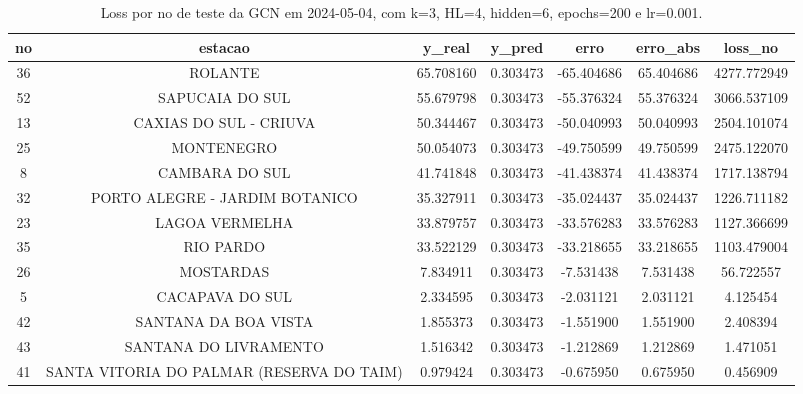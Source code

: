 \begin{table}[h]
\centering
\caption{Loss por no de teste da GCN em 2024-05-04, com k=3, HL=4, hidden=6, epochs=200 e lr=0.001.}
\label{tab:gcn_loss_k3_hl4_h6_e200_d20240504}
\begin{tabular}{ccccccc}
\toprule
no & estacao & y\_real & y\_pred & erro & erro\_abs & loss\_no \\
\midrule
36 & ROLANTE & 65.708160 & 0.303473 & -65.404686 & 65.404686 & 4277.772949 \\
52 & SAPUCAIA DO SUL & 55.679798 & 0.303473 & -55.376324 & 55.376324 & 3066.537109 \\
13 & CAXIAS DO SUL - CRIUVA & 50.344467 & 0.303473 & -50.040993 & 50.040993 & 2504.101074 \\
25 & MONTENEGRO & 50.054073 & 0.303473 & -49.750599 & 49.750599 & 2475.122070 \\
8 & CAMBARA DO SUL & 41.741848 & 0.303473 & -41.438374 & 41.438374 & 1717.138794 \\
32 & PORTO ALEGRE - JARDIM BOTANICO & 35.327911 & 0.303473 & -35.024437 & 35.024437 & 1226.711182 \\
23 & LAGOA VERMELHA & 33.879757 & 0.303473 & -33.576283 & 33.576283 & 1127.366699 \\
35 & RIO PARDO & 33.522129 & 0.303473 & -33.218655 & 33.218655 & 1103.479004 \\
26 & MOSTARDAS & 7.834911 & 0.303473 & -7.531438 & 7.531438 & 56.722557 \\
5 & CACAPAVA DO SUL & 2.334595 & 0.303473 & -2.031121 & 2.031121 & 4.125454 \\
42 & SANTANA DA BOA VISTA & 1.855373 & 0.303473 & -1.551900 & 1.551900 & 2.408394 \\
43 & SANTANA DO LIVRAMENTO & 1.516342 & 0.303473 & -1.212869 & 1.212869 & 1.471051 \\
41 & SANTA VITORIA DO PALMAR (RESERVA DO TAIM) & 0.979424 & 0.303473 & -0.675950 & 0.675950 & 0.456909 \\
\bottomrule
\end{tabular}
\end{table}
